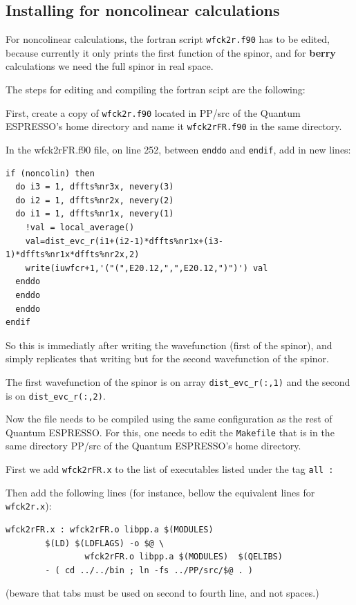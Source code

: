 \documentclass[a4paper,12pt]{report}
\begin{document}
\begin{appendices}

\chapter{Installing for noncolinear calculations}
\label{ch:noncolinear}

For noncolinear calculations, the fortran script \verb|wfck2r.f90| has to be edited,
because currently it only prints the first function of the spinor,
and for \textbf{berry} calculations we need the full spinor in real space.


The steps for editing and compiling the fortran scipt are the following:

First, create a copy of \verb|wfck2r.f90| located in PP/src of the {\sc Quantum ESPRESSO}'s home directory
and name it \verb|wfck2rFR.f90| in the same directory.

In the wfck2rFR.f90 file, on line 252, between \verb|enddo| and \verb|endif|, add in new lines:
\begin{verbatim}
if (noncolin) then
  do i3 = 1, dffts%nr3x, nevery(3)
  do i2 = 1, dffts%nr2x, nevery(2)
  do i1 = 1, dffts%nr1x, nevery(1)
    !val = local_average()
    val=dist_evc_r(i1+(i2-1)*dffts%nr1x+(i3-1)*dffts%nr1x*dffts%nr2x,2)
    write(iuwfcr+1,'("(",E20.12,",",E20.12,")")') val
  enddo
  enddo
  enddo
endif
\end{verbatim}
So this is immediatly after writing the wavefunction (first of the spinor),
and simply replicates that writing but for the second wavefunction of the spinor.

The first wavefunction of the spinor is on array \verb|dist_evc_r(:,1)| and the second is on
\verb|dist_evc_r(:,2)|.

Now the file needs to be compiled using the same configuration as the rest of {\sc Quantum ESPRESSO}.
For this, one needs to edit  the \verb|Makefile| that is in the same directory PP/src of the {\sc Quantum ESPRESSO}'s home directory.

First we add \verb|wfck2rFR.x| to the list of executables listed under the tag \verb|all : |

Then add the following lines (for instance, bellow  the equivalent lines for \verb|wfck2r.x|):

\begin{verbatim}
wfck2rFR.x : wfck2rFR.o libpp.a $(MODULES)
        $(LD) $(LDFLAGS) -o $@ \
                wfck2rFR.o libpp.a $(MODULES)  $(QELIBS)
        - ( cd ../../bin ; ln -fs ../PP/src/$@ . )
\end{verbatim}
(beware that tabs must be used on second to fourth line, and not spaces.)


\end{appendices}
\end{document}
